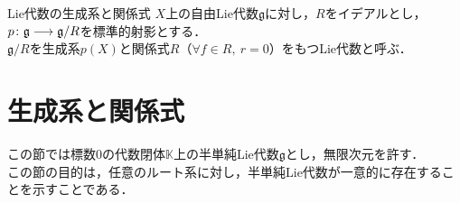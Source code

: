\documentclass[rep_main]{subfiles}
\begin{document}
\begin{mydef}[label=def:Lie-alg-generators-relation]{Lie代数の生成系と関係式}
	$X$上の自由Lie代数$\mathfrak{g}$に対し，$R$をイデアルとし，$p\colon \mathfrak{g} \longrightarrow \mathfrak{g}/R$を標準的射影とする．\\
	$\mathfrak{g} / R$を生成系$p(X)$と関係式$R$（$\forall f \in R,\ r = 0$）をもつLie代数と呼ぶ．
\end{mydef}
 
\section{生成系と関係式}
この節では標数$0$の代数閉体$\mathbb{K}$上の半単純Lie代数$\mathfrak{g}$とし，無限次元を許す．\\
この節の目的は，任意のルート系に対し，半単純Lie代数が一意的に存在することを示すことである．
\end{document}
